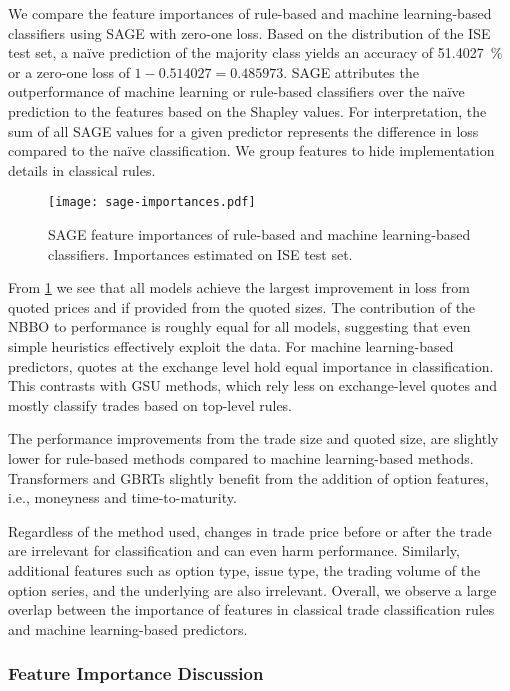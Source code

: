 We compare the feature importances of rule-based and machine learning-based classifiers using \gls{SAGE} with zero-one loss. Based on the distribution of the \gls{ISE} test set, a na\"ive prediction of the majority class yields an accuracy of \SI{51.4027}{\percent} or a zero-one loss of $1- \num{0.514027} = \num{0.485973}$. \gls{SAGE} attributes the outperformance of machine learning or rule-based classifiers over the na\"ive prediction to the features based on the Shapley values. For interpretation, the sum of all \gls{SAGE} values for a given predictor represents the difference in loss compared to the na\"ive classification. We group features to hide implementation details in classical rules.

\begin{figure}[h!]
    \centering
    \texttt{[image: sage-importances.pdf]}
    \caption[ Feature Importances For Classifiers]{\gls{SAGE} feature importances of rule-based and machine learning-based classifiers. Importances estimated on \gls{ISE} test set.}
    \label{fig:sage-importances}
\end{figure}

From \cref{fig:sage-importances} we see that all models achieve the largest improvement in loss from quoted prices and if provided from the quoted sizes. The contribution of the \gls{NBBO} to performance is roughly equal for all models, suggesting that even simple heuristics effectively exploit the data. For machine learning-based predictors, quotes at the exchange level hold equal importance in classification. This contrasts with \gls{GSU} methods, which rely less on exchange-level quotes and mostly classify trades based on top-level rules. 

The performance improvements from the trade size and quoted size, are slightly lower for rule-based methods compared to machine learning-based methods.  Transformers and \glspl{GBRT} slightly benefit from the addition of option features, i.e., moneyness and time-to-maturity. 

Regardless of the method used, changes in trade price before or after the trade are irrelevant for classification and can even harm performance. Similarly, additional features such as option type, issue type, the trading volume of the option series, and the underlying are also irrelevant. Overall, we observe a large overlap between the importance of features in classical trade classification rules and machine learning-based predictors.

\subsubsection{Feature Importance Discussion}\label{sec:feature-importance-discussion}

